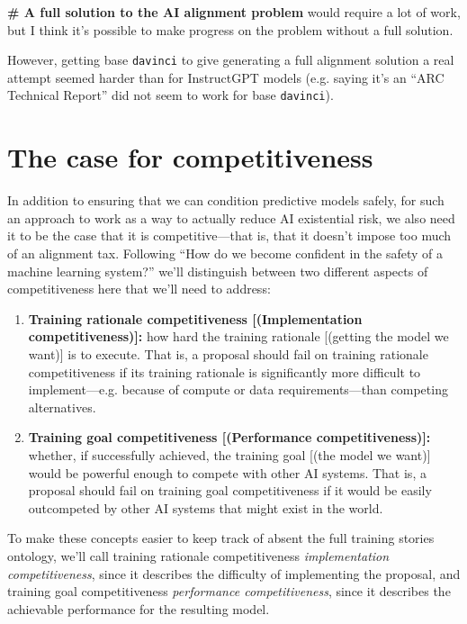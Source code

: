 \documentclass[
  onecolumn,
  nonatbib,
]{miri-tech-article}
\newenvironment{modelquote}%
  {\list{}{\leftmargin=0.3in\rightmargin=0.3in}\item[]}%
  {\endlist}
\begin{document}
\begin{modelquote}
\textbf{\# A full solution to the AI alignment problem} would require a lot of work, but I think it's possible to make progress on the problem without a full solution.
\end{modelquote}

     However, getting base \texttt{davinci} to give generating a full alignment solution a real attempt seemed harder than for InstructGPT models (e.g. saying it's an ``ARC Technical Report'' did not seem to work for base \texttt{davinci}).




\section{The case for competitiveness}
\label{sec:3}

In addition to ensuring that we can condition predictive models safely, for such an approach to work as a way to actually reduce AI existential risk, we also need it to be the case that it is competitive---that is, that it doesn't impose too much of an alignment tax\cite{paul_christiano_current_work}. Following ``How do we become confident in the safety of a machine learning system?\cite{how_become_confident}'' we'll distinguish between two different aspects of competitiveness here that we'll need to address:

\begin{enumerate}
\item \textbf{Training rationale competitiveness [(Implementation competitiveness)]:} how hard the training rationale [(getting the model we want)] is to execute. That is, a proposal should fail on training rationale competitiveness if its training rationale is significantly more difficult to implement---e.g. because of compute or data requirements---than competing alternatives.
\item \textbf{Training goal competitiveness [(Performance competitiveness)]:} whether, if successfully achieved, the training goal [(the model we want)] would be powerful enough to compete with other AI systems. That is, a proposal should fail on training goal competitiveness if it would be easily outcompeted by other AI systems that might exist in the world.
\end{enumerate}

To make these concepts easier to keep track of absent the full training stories ontology\cite{how_become_confident}, we'll call training rationale competitiveness \textit{implementation competitiveness}, since it describes the difficulty of implementing the proposal, and training goal competitiveness \textit{performance competitiveness}, since it describes the achievable performance for the resulting model.
\end{document}
